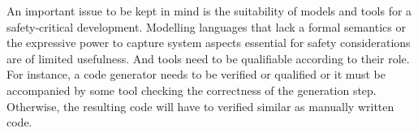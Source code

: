 An important issue to be kept in mind is the suitability of models
and tools for a safety-critical development. Modelling languages that
lack a formal semantics or the expressive power to capture system
aspects essential for safety considerations are of limited
usefulness. And tools need to be qualifiable according to their role.  
For instance, a code generator needs to be verified or qualified or it
must be accompanied by some tool checking the correctness of the
generation step. Otherwise, the resulting code will have to verified
similar as manually written code.



